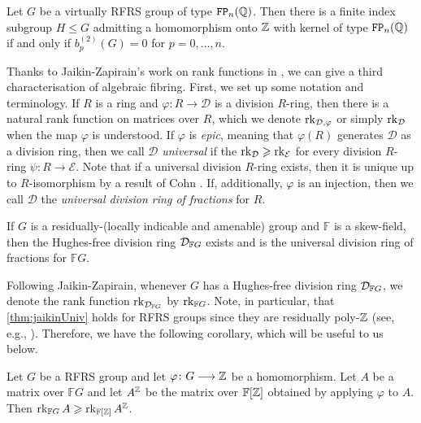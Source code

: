 \documentclass[11pt, letterpaper]{amsart}
\begin{document}
\begin{thm}\label{thm:b2rfrs}
Let $G$ be a virtually RFRS group of type $\mathtt{FP}_n(\mathbb{Q})$. Then there is a finite index subgroup $H \leqslant G$ admitting a homomorphism onto $\mathbb{Z}$ with kernel of type $\mathtt{FP}_n(\mathbb{Q})$ if and only if $b_p^{(2)}(G) = 0$ for $p = 0, \dots, n$.
\end{thm}


Thanks to Jaikin-Zapirain's work on rank functions in \cite{JaikinZapirain2020THEUO}, we can give a third characterisation of algebraic fibring. First, we set up some notation and terminology. If $R$ is a ring and $\varphi \colon R \longrightarrow \mathcal D$ is a division $R$-ring, then there is a natural rank function on matrices over $R$, which we denote $\operatorname{rk}_{\mathcal D, \varphi}$ or simply $\operatorname{rk}_{\mathcal D}$ when the map $\varphi$ is understood. If $\varphi$ is \textit{epic}, meaning that $\varphi(R)$ generates $\mathcal D$ as a division ring, then we call $\mathcal D$ \textit{universal} if the $\operatorname{rk}_\mathcal D \geqslant \operatorname{rk}_\mathcal E$ for every division $R$-ring $\psi \colon R \longrightarrow \mathcal E$. Note that if a universal division $R$-ring exists, then it is unique up to $R$-isomorphism by a result of Cohn \cite[Theorem 4.4.1]{cohn1995skew}. If, additionally, $\varphi$ is an injection, then we call $\mathcal D$ the \textit{universal division ring of fractions} for $R$.

\begin{thm}  \label{thm:jaikinUniv}
    If $G$ is a residually-(locally indicable and amenable) group and $\mathbb F$ is a skew-field, then the Hughes-free division ring $\mathcal{D}_{\mathbb F{G}}$ exists and is the universal division ring of fractions for $\mathbb FG$.
\end{thm}

Following Jaikin-Zapirain, whenever $G$ has a Hughes-free division ring $\mathcal{D}_{\mathbb F{G}}$, we denote the rank function $\operatorname{rk}_{\mathcal{D}_{\mathbb F{G}}}$ by $\operatorname{rk}_{\mathbb FG}$. Note, in particular, that \cref{thm:jaikinUniv} holds for RFRS groups since they are residually poly-$\mathbb{Z}$ (see, e.g., \cite[Proposition 4.4]{JaikinZapirain2020THEUO}). Therefore, we have the following corollary, which will be useful to us below.

\begin{cor}\label{cor:rkIneq}
    Let $G$ be a RFRS group and let $\varphi \colon G \longrightarrow \mathbb{Z}$ be a homomorphism. Let $A$ be a matrix over $\mathbb FG$ and let $A^{\mathbb{Z}}$ be the matrix over $\mathbb F[\mathbb{Z}]$ obtained by applying $\varphi$ to $A$. Then $\operatorname{rk}_{\mathbb FG} A \geqslant \operatorname{rk}_{\mathbb F[\mathbb{Z}]} A^{\mathbb{Z}}$.
\end{cor}
\end{document}
